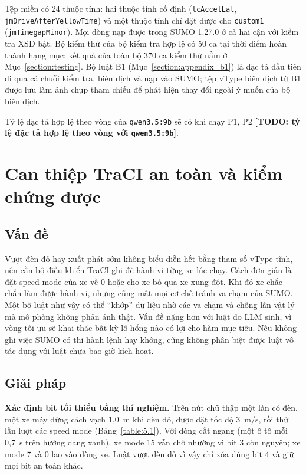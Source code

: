 \documentclass[../DoAn.tex]{subfiles}
\begin{document}
Tệp miền có 24 thuộc tính: hai thuộc tính cố định (\texttt{lcAccelLat}, \texttt{jmDriveAfterYellowTime}) và một thuộc tính chỉ đặt được cho \texttt{custom1} (\texttt{jmTimegapMinor}). Mọi dòng nạp được trong SUMO 1.27.0 ở cả hai cận với kiểm tra XSD bật. Bộ kiểm thử của bộ kiểm tra hợp lệ có 50 ca tại thời điểm hoàn thành hạng mục; kết quả của toàn bộ 370 ca kiểm thử nằm ở Mục~\ref{section:testing}. Bộ luật B1 (Mục~\ref{section:appendix_b1}) là đặc tả đầu tiên đi qua cả chuỗi kiểm tra, biên dịch và nạp vào SUMO; tệp vType biên dịch từ B1 được lưu làm ảnh chụp tham chiếu để phát hiện thay đổi ngoài ý muốn của bộ biên dịch.

Tỷ lệ đặc tả hợp lệ theo vòng của \texttt{qwen3.5:9b} sẽ có khi chạy P1, P2 \textbf{[TODO: tỷ lệ đặc tả hợp lệ theo vòng với \texttt{qwen3.5:9b}]}.

\section{Can thiệp TraCI an toàn và kiểm chứng được}
\label{section:5.2}

\subsection{Vấn đề}

Vượt đèn đỏ hay xuất phát sớm không biểu diễn hết bằng tham số vType tĩnh, nên cần bộ điều khiển TraCI ghi đè hành vi từng xe lúc chạy. Cách đơn giản là đặt speed mode của xe về 0 hoặc cho xe bỏ qua xe xung đột. Khi đó xe chắc chắn làm được hành vi, nhưng cũng mất mọi cơ chế tránh va chạm của SUMO. Một bộ luật như vậy có thể ``khớp'' dữ liệu nhờ các va chạm và chồng lấn vật lý mà mô phỏng không phản ánh thật. Vấn đề nặng hơn với luật do LLM sinh, vì vòng tối ưu sẽ khai thác bất kỳ lỗ hổng nào có lợi cho hàm mục tiêu. Nếu không ghi việc SUMO có thi hành lệnh hay không, cũng không phân biệt được luật vô tác dụng với luật chưa bao giờ kích hoạt.

\subsection{Giải pháp}

\textbf{Xác định bit tối thiểu bằng thí nghiệm.} Trên nút chữ thập một làn có đèn, một xe máy dừng cách vạch 1,0~m khi đèn đỏ, được đặt tốc độ 3~m/s, rồi thử lần lượt các speed mode (Bảng~\ref{table:5.1}). Với dòng cắt ngang (một ô tô mỗi 0,7~s trên hướng đang xanh), xe mode 15 vẫn chờ nhường vì bit 3 còn nguyên; xe mode 7 và 0 lao vào dòng xe. Luật vượt đèn đỏ vì vậy chỉ xóa đúng bit 4 và giữ mọi bit an toàn khác.
\end{document}
